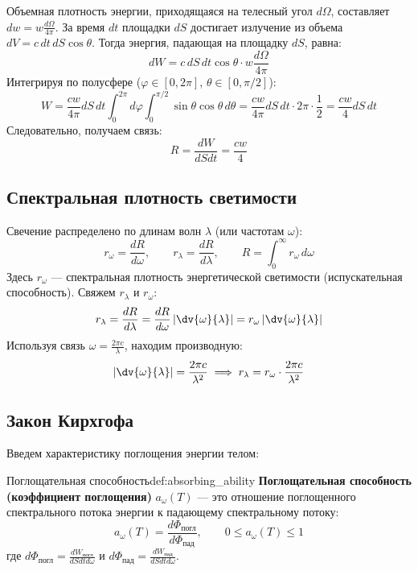 Объемная плотность энергии, приходящаяся на телесный угол $d\Omega$, составляет $dw = w \frac{d\Omega}{4\pi}$. За время $dt$ площадки $dS$ достигает излучение из объема $dV = c\, dt\, dS \cos\theta$. Тогда энергия, падающая на площадку $dS$, равна:
\begin{equation}
	dW = c\, dS\, dt \cos\theta \cdot w \frac{d\Omega}{4\pi}
\end{equation}
Интегрируя по полусфере ($\varphi \in [0, 2\pi]$, $\theta \in [0, \pi/2]$):
\begin{equation}
	W = \frac{c w}{4\pi} dS\, dt \int_{0}^{2\pi} d\varphi \int_{0}^{\pi/2} \sin\theta \cos\theta\, d\theta = \frac{c w}{4\pi} dS\, dt \cdot 2\pi \cdot \frac{1}{2} = \frac{c w}{4} dS\, dt
\end{equation}
Следовательно, получаем связь:
\begin{equation}
	R = \frac{dW}{dS dt} = \frac{c w}{4}
\end{equation}

\subsection{Спектральная плотность светимости}

Свечение распределено по длинам волн $\lambda$ (или частотам $\omega$):
\begin{equation}
	r_\omega = \frac{dR}{d\omega}, \qquad r_\lambda = \frac{dR}{d\lambda}, \qquad R = \int_{0}^{\infty} r_\omega\, d\omega
\end{equation}
Здесь $r_\omega$ --- спектральная плотность энергетической светимости (испускательная способность). Свяжем $r_\lambda$ и $r_\omega$:
\begin{equation}
	r_\lambda = \frac{dR}{d\lambda} = \frac{dR}{d\omega} \left| \dv{\omega}{\lambda} \right| = r_\omega \left| \dv{\omega}{\lambda} \right|
\end{equation}
Используя связь $\omega = \frac{2\pi c}{\lambda}$, находим производную:
\begin{equation}
	\left| \dv{\omega}{\lambda} \right| = \frac{2\pi c}{\lambda^2} \implies r_\lambda = r_\omega \cdot \frac{2\pi c}{\lambda^2}
\end{equation}

\subsection{Закон Кирхгофа}

Введем характеристику поглощения энергии телом:
\begin{definition}{Поглощательная способность}{def:absorbing_ability}
	\textbf{Поглощательная способность (коэффициент поглощения)} $a_\omega(T)$ --- это отношение поглощенного спектрального потока энергии к падающему спектральному потоку:
	\begin{equation}
		a_\omega(T) = \frac{d\Phi_{\text{погл}}}{d\Phi_{\text{пад}}}, \qquad 0 \le a_\omega(T) \le 1
	\end{equation}
	где $d\Phi_{\text{погл}} = \frac{dW_{\text{погл}}}{dS dt d\omega}$ и $d\Phi_{\text{пад}} = \frac{dW_{\text{пад}}}{dS dt d\omega}$.
\end{definition}

